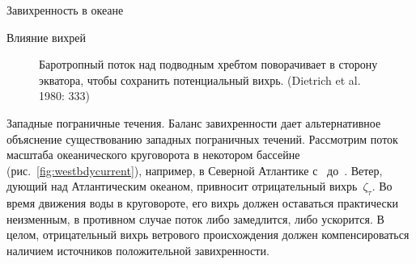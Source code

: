\begin{chapter}{Завихренность в океане}
\begin{section}{Влияние вихрей}
\begin{figure}[h!]
\begin{center}
\end{center}
\caption{Баротропный поток над подводным хребтом поворачивает в сторону
экватора, чтобы сохранить потенциальный вихрь. 
(Dietrich et al. 1980: 333)}
\label{fig:ridgevorticity}
\vspace{-3ex}
\end{figure}
%
%

\begin{paragraph}{Западные пограничные течения.}
Баланс завихренности дает альтернативное объяснение существованию
западных пограничных течений. Рассмотрим поток масштаба океанического
круговорота в некотором бассейне (рис.~\ref{fig:westbdycurrent}), 
например, в Северной Атлантике с~ до~. 
Ветер, дующий над Атлантическим океаном, привносит отрицательный 
вихрь~$\zeta_{\tau}$. Во время движения воды в круговороте, его вихрь должен
оставаться практически неизменным, в противном случае поток либо замедлится,
либо ускорится. В целом, отрицательный вихрь ветрового происхождения
должен компенсироваться наличием источников положительной завихренности.
%


\end{paragraph}
\end{section}
\end{chapter}
